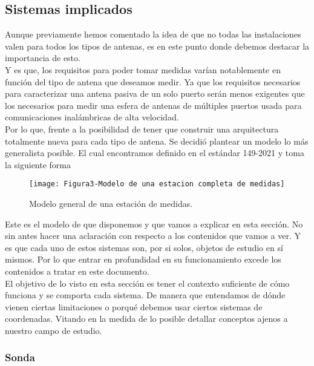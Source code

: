 \subsection{Sistemas implicados} 

Aunque previamente hemos comentado la idea de que no todas las instalaciones valen para todos los tipos de antenas, es en este punto donde debemos destacar la importancia de esto.\\ 

Y es que, los requisitos para poder tomar medidas varían notablemente en función del tipo de antena que deseamos medir. Ya que los requisitos necesarios para caracterizar una antena pasiva de un solo puerto serán menos exigentes que los necesarios para medir una esfera de antenas de múltiples puertos usada para comunicaciones inalámbricas de alta velocidad. 
\\

Por lo que, frente a la posibilidad de tener que construir una arquitectura totalmente nueva para cada tipo de antena. Se decidió plantear un modelo lo más generalista posible. El cual encontramos definido en el estándar 149-2021 y toma la siguiente forma
\newpage

\begin{figure}[h]
    \centering
    \texttt{[image: Figura3-Modelo de una estacion completa de medidas]}
    \caption{Modelo general de una estación de medidas.}
    \label{Modelo-general-de-una-estación-de-medidas}
\end{figure}

Este es el modelo de que disponemos y que vamos a explicar en esta sección. No sin antes hacer una aclaración con respecto a los contenidos que vamos a ver. Y es que cada uno de estos sistemas son, por si solos, objetos de estudio en sí mismos. Por lo que entrar en profundidad en su funcionamiento excede los contenidos a tratar en este documento.
\\

El objetivo de lo visto en esta sección es tener el contexto suficiente de cómo funciona y se comporta cada sistema. De manera que entendamos de dónde vienen ciertas limitaciones o porqué debemos usar ciertos sistemas de coordenadas. Vitando en la medida de lo posible detallar conceptos ajenos a nuestro campo de estudio. 

\subsubsection{Sonda} 

